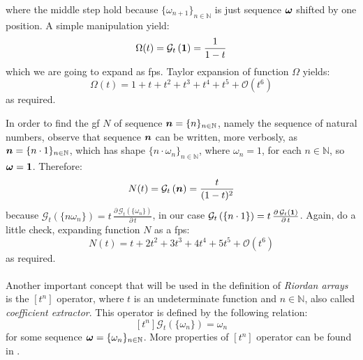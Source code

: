 where the middle step hold because $\lbrace\omega_{n+1}\rbrace_{n\in\mathbb{N}}$ is
just sequence $\boldsymbol{\omega}$ shifted by one position. A simple manipulation yield:
\begin{equation}
    \Omega(t)=\mathcal{G}_{t}\left(\boldsymbol{1}\right) =\frac{1}{1-t}
    \label{eq:1:gf}
\end{equation}
which we are going to expand as \ac{fps}. Taylor expansion of function $\Omega$
yields:
\begin{displaymath}
    \Omega(t)=1+t+t^{2}+t^{3}+t^{4}+t^{5}+\mathcal{O}(t^{6})
\end{displaymath}
as required.

In order to find the \ac{gf} $N$ of sequence $\boldsymbol{n}=\lbrace
n\rbrace_{n\in\mathbb{N}}$, namely the sequence of natural numbers, observe
that sequence $\boldsymbol{n}$ can be written, more verbosly, as $\boldsymbol{n}=\lbrace
n\cdot1\rbrace_{n\in\mathbb{N}}$, which has shape $\lbrace
n\cdot\omega_{n}\rbrace_{n\in\mathbb{N}}$, where $\omega_{n}=1$, for each
$n\in\mathbb{N}$, so $\boldsymbol{\omega}=\boldsymbol{1}$. Therefore:
\begin{equation}
    N(t)=\mathcal{G}_{t}\left(\boldsymbol{n}\right) =\frac{t}{(1-t)^{2}}
    \label{eq:n:gf}
\end{equation}
because $\mathcal{G}_{t}\left(\lbrace n\omega_{n}\rbrace\right) =t\,
\frac{\partial\,\mathcal{G}_{t}\left(\lbrace
\omega_{n}\rbrace\right)}{\partial\,t}$, in our case
$\mathcal{G}_{t}\left(\lbrace n\cdot1\rbrace\right) =
t\,\frac{\partial\,\mathcal{G}_{t}\left(\boldsymbol{1}\right)}{\partial\,t}$.
Again, do a little check, expanding function $N$ as a \ac{fps}:
\begin{displaymath}
    N(t)=t+2t^{2}+3t^{3}+4t^{4}+5t^{5}+\mathcal{O}(t^{6})
\end{displaymath}
as required.
\\\\
Another important concept that will be used in the definition of
\emph{Riordan arrays} is the $\left[t^{n}\right]$ operator, where
$t$ is an undeterminate function and $n\in\mathbb{N}$, also called
\emph{coefficient extractor}. This operator is defined by the following
relation:
\begin{equation}
    \left[t^{n}\right]\mathcal{G}_{t}\left(\lbrace\omega_{n}\rbrace\right) = \omega_{n}
    \label{eq:coefficient:extractor:def}
\end{equation}
for some sequence $\boldsymbol{\omega}=\lbrace\omega_{n}\rbrace_{n\in\mathbb{N}}$. More properties
of $\left[t^{n}\right]$ operator can be found in \cite{merlini:method:of:coefficient}.




